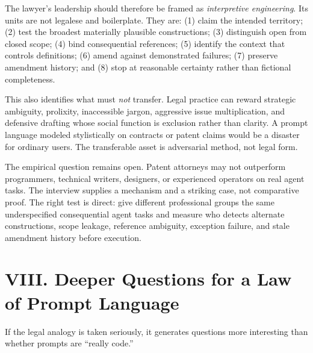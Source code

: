 \documentclass[11pt]{article}
\begin{document}
The lawyer's leadership should therefore be framed as \emph{interpretive engineering}. Its units are not legalese and boilerplate. They are: (1) claim the intended territory; (2) test the broadest materially plausible constructions; (3) distinguish open from closed scope; (4) bind consequential references; (5) identify the context that controls definitions; (6) amend against demonstrated failures; (7) preserve amendment history; and (8) stop at reasonable certainty rather than fictional completeness.

This also identifies what must \emph{not} transfer. Legal practice can reward strategic ambiguity, prolixity, inaccessible jargon, aggressive issue multiplication, and defensive drafting whose social function is exclusion rather than clarity. A prompt language modeled stylistically on contracts or patent claims would be a disaster for ordinary users. The transferable asset is adversarial method, not legal form.

The empirical question remains open. Patent attorneys may not outperform programmers, technical writers, designers, or experienced operators on real agent tasks. The interview supplies a mechanism and a striking case, not comparative proof. The right test is direct: give different professional groups the same underspecified consequential agent tasks and measure who detects alternate constructions, scope leakage, reference ambiguity, exception failure, and stale amendment history before execution.

\section*{VIII. Deeper Questions for a Law of Prompt Language}
If the legal analogy is taken seriously, it generates questions more interesting than whether prompts are ``really code.''
\end{document}
